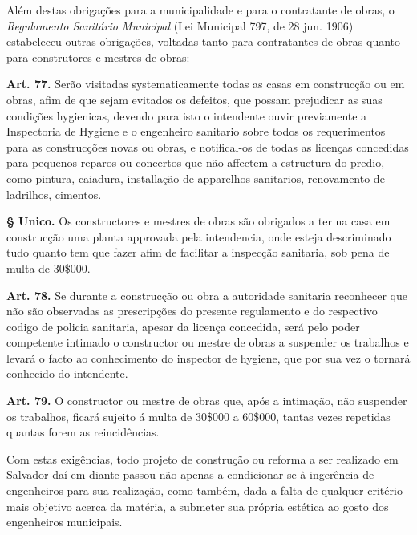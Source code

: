Além destas obrigações para a municipalidade e para o contratante de obras, o \textit{Regulamento Sanitário Municipal} (Lei Municipal 797, de 28 jun. 1906) \cite{prefeitura_sanitario_1906} estabeleceu outras obrigações, voltadas tanto para contratantes de obras quanto para construtores e mestres de obras:

\begin{citacao}
\textbf{Art. 77.} Serão visitadas systematicamente todas as casas em construcção ou em obras, afim de que sejam evitados os defeitos, que possam prejudicar as suas condições hygienicas, devendo para isto o intendente ouvir previamente a Inspectoria de Hygiene e o engenheiro sanitario sobre todos os requerimentos para as construcções novas ou obras, e notifical-os de todas as licenças concedidas para pequenos reparos ou concertos que não affectem a estructura do predio, como pintura, caiadura, installação de apparelhos sanitarios, renovamento de ladrilhos, cimentos.

\textbf{§ Unico.} Os constructores e mestres de obras são obrigados a ter na casa em construcção uma planta approvada pela intendencia, onde esteja descriminado tudo quanto tem que fazer afim de facilitar a inspecção sanitaria, sob pena de multa de 30\$000.

\textbf{Art. 78.} Se durante a construcção ou obra a autoridade sanitaria reconhecer que não são observadas as prescripções do presente regulamento e do respectivo codigo de policia sanitaria, apesar da licença concedida, será pelo poder competente intimado o constructor ou mestre de obras a suspender os trabalhos e levará o facto ao conhecimento do inspector de hygiene, que por sua vez o tornará conhecido do intendente.

\textbf{Art. 79.} O constructor ou mestre de obras que, após a intimação, não suspender os trabalhos, ficará sujeito á multa de 30\$000 a 60\$000, tantas vezes repetidas quantas forem as reincidências.
\end{citacao}

Com estas exigências, todo projeto de construção ou reforma a ser realizado em Salvador daí em diante passou não apenas a condicionar-se à ingerência de engenheiros para sua realização, como também, dada a falta de qualquer critério mais objetivo acerca da matéria, a submeter sua própria estética ao gosto dos engenheiros municipais.

